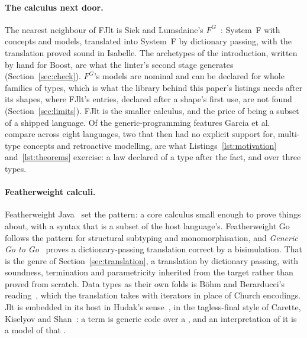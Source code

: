 \paragraph{The calculus next door.}
The nearest neighbour of FJlt is Siek and Lumsdaine's $F^G$~\cite{siek2005essential,siek2004formalization}: System~F with concepts and models, translated into System~F by dictionary passing, with the translation proved sound in Isabelle.
The archetypes of the introduction, written by hand for Boost, are what the linter's second stage generates (Section~\ref{sec:check}).
$F^G$'s models are nominal and can be declared for whole families of types, which is what the library behind this paper's listings needs after its shapes, where FJlt's entries, declared after a shape's first use, are not found (Section~\ref{sec:limits}).
FJlt is the smaller calculus, and the price of being a subset of a shipped language.
Of the generic-programming features Garcia et al.~\cite{garcia2007extended} compare across eight languages, two that \Cpp{} then had no explicit support for, multi-type concepts and retroactive modelling, are what Listings~\ref{lst:motivation} and~\ref{lst:theorems} exercise: a law declared of a type after the fact, and  over three types.

\paragraph{Featherweight calculi.}
Featherweight Java~\cite{igarashi2001featherweight} set the pattern: a core calculus small enough to prove things about, with a syntax that is a subset of the host language's.
Featherweight Go~\cite{griesemer2020featherweight} follows the pattern for structural subtyping and monomorphisation, and \emph{Generic Go to Go}~\cite{ellis2022generic} proves a dictionary-passing translation correct by a bisimulation.
That is the genre of Section~\ref{sec:translation}, a translation by dictionary passing, with soundness, termination and parametricity inherited from the target rather than proved from scratch.
Data types as their own folds is B\"ohm and Berarducci's reading~\cite{bohm1985automatic}, which the translation takes with iterators in place of Church encodings.
Jlt is embedded in its host in Hudak's sense~\cite{hudak1996building}, in the tagless-final style of Carette, Kiselyov and Shan~\cite{carette2009finally}: a term is generic code over a , and an interpretation of it is a model of that .

